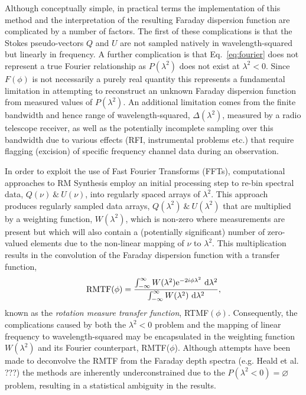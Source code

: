 \documentclass[fleqn,usenatbib]{mnras}
\begin{document}
Although conceptually simple, in practical terms the implementation of this method and the interpretation of the resulting Faraday dispersion function are complicated by a number of factors. The first of these complications is that the Stokes pseudo-vectors $Q$ and $U$ are not sampled natively in wavelength-squared but linearly in frequency. A further complication is that Eq.~\ref{eq:fourier} does not represent a true Fourier relationship as $P(\lambda^2)$ does not exist at $\lambda^2 < 0$. Since $F(\phi)$ is not necessarily a purely real quantity this represents a fundamental limitation in attempting to reconstruct an unknown Faraday dispersion function from measured values of $P(\lambda^2)$. An additional limitation comes from the finite bandwidth and hence range of wavelength-squared, $\Delta (\lambda^2)$, measured by a radio telescope receiver, as well as the potentially incomplete sampling over this bandwidth due to various effects (RFI, instrumental problems etc.) that require flagging (excision) of specific frequency channel data during an observation.

In order to exploit the use of Fast Fourier Transforms (FFTs), computational approaches to RM Synthesis employ an initial processing step to re-bin spectral data, $Q(\nu)~\&~U(\nu)$, into regularly spaced arrays of $\lambda^2$. This approach produces regularly sampled data arrays, $Q(\lambda^2)~\&~U(\lambda^2)$ that are multiplied by a weighting function, $W(\lambda^2)$, which is non-zero where measurements are present but which will also contain a (potentially significant) number of zero-valued elements due to the non-linear mapping of $\nu$ to $\lambda^2$. This  multiplication results in the convolution of the Faraday dispersion function with a transfer function,
%
\begin{equation}
{\rm RMTF}(\phi) = \frac{\int_{-\infty}^{\infty} { W(\lambda^2){\rm e}^{-2i\phi\lambda^2}~{\rm d}\lambda^2 }}{\int_{-\infty}^{\infty} { W(\lambda^2)~{\rm d}\lambda^2 }},
\end{equation}
%
known as the \emph{rotation measure transfer function}, RTMF$(\phi)$. Consequently, the complications caused by both the $\lambda^2 < 0$ problem and the mapping of linear frequency to wavelength-squared may be encapsulated in the weighting function $W(\lambda^2)$ and its Fourier counterpart, RMTF($\phi$). Although attempts have been made to deconvolve the RMTF from the Faraday depth spectra (e.g. Heald et al. ???) the  methods are inherently underconstrained due to the $P(\lambda^2<0) = \varnothing$ problem, resulting in a statistical ambiguity in the results.
\end{document}
